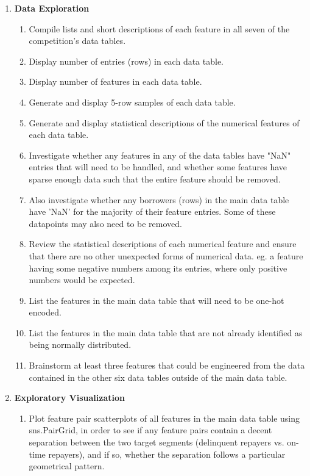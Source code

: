 \documentclass[12pt, letterpaper]{article}
\begin{document}
\renewcommand{\labelenumi}{\Roman{enumi}}
\begin{enumerate}
  \item \textbf{Data Exploration}
    \begin{enumerate}
      \item Compile lists and short descriptions of each feature in all seven of the competition's data tables.
      \item Display number of entries (rows) in each data table.
      \item Display number of features in each data table.
      \item Generate and display 5-row samples of each data table.
      \item Generate and display statistical descriptions of the numerical features of each data table.
      \item Investigate whether any features in any of the data tables have "NaN" entries that will need to be handled, and whether some features have sparse enough data such that the entire feature should be removed.
      \item Also investigate whether any borrowers (rows) in the main data table have 'NaN' for the majority of their feature entries. Some of these datapoints may also need to be removed.
      \item Review the statistical descriptions of each numerical feature and ensure that there are no other unexpected forms of numerical data. eg. a feature having some negative numbers among its entries, where only positive numbers would be expected.
      \item List the features in the main data table that will need to be one-hot encoded.
      \item List the features in the main data table that are not already identified as being normally distributed.
      \item Brainstorm at least three features that could be engineered from the data contained in the other six data tables outside of the main data table.
    \end{enumerate}
  \item \textbf{Exploratory Visualization}
    \begin{enumerate}
      \item Plot feature pair scatterplots of all features in the main data table using sns.PairGrid, in order to see if any feature pairs contain a decent separation between the two target segments (delinquent repayers vs. on-time repayers), and if so, whether the separation follows a particular geometrical pattern.

\end{enumerate}
\end{enumerate}
\end{document}
